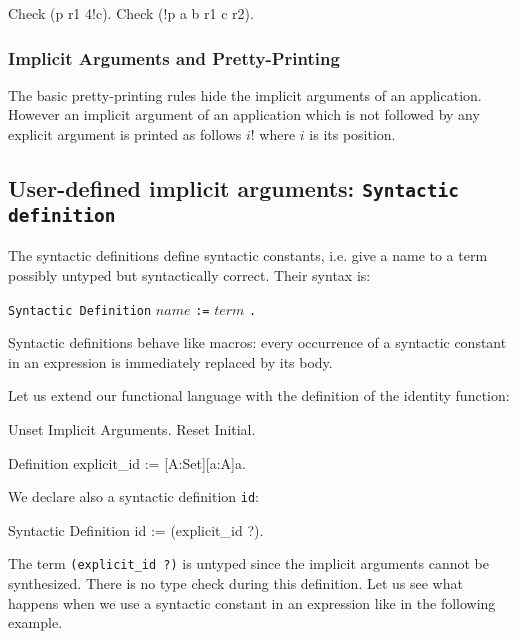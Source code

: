{\begin{coq_example}
\Example

\begin{coq_example}
Check (p r1 4!c).
Check (!p a b r1 c r2).
\end{coq_example}

\subsubsection{Implicit Arguments and Pretty-Printing}

The basic pretty-printing rules hide the implicit arguments of an
application. However an implicit argument {\term} of an application
which is not followed by any explicit argument is printed as follows
$i!${\term} where $i$ is its position.

\subsection{User-defined implicit arguments: {\tt Syntactic definition}}
\label{Syntactic-Definition}

The syntactic definitions define syntactic constants, i.e. give a name
to a term possibly untyped but syntactically correct. Their syntax
is:

\begin{center}
\verb+Syntactic Definition+ $name$ \verb+:=+ $term$ \verb+.+ \\
\end{center}

Syntactic definitions behave like macros: every occurrence of a
syntactic constant in an expression is immediately replaced by its
body.

Let us extend our functional language with the definition of the
identity function:

\begin{coq_eval}
Unset Implicit Arguments.
Reset Initial.
\end{coq_eval}
\begin{coq_example}
Definition explicit_id := [A:Set][a:A]a.
\end{coq_example}

We declare also a syntactic definition {\tt id}:

\begin{coq_example}
Syntactic Definition id := (explicit_id ?).
\end{coq_example}

The term {\tt (explicit\_id ?)} is untyped since the implicit
arguments cannot be synthesized. There is no type check during this
definition.  Let us see what happens when we use a syntactic constant
in an expression like in the following example.


\end{coq_example}}
